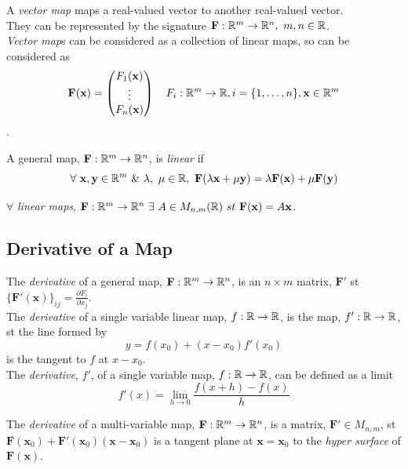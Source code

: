 \documentclass[11pt,a4paper]{article}
\begin{document}
A \textit{vector map} maps a real-valued vector to another real-valued vector.\\
They can be represented by the signature $\textbf{F} : \mathbb{R}^m \to \mathbb{R}^n,\ m,n \in \mathbb{R}$.\\
\textit{Vector map}s can be considered as a collection of linear maps, so can be considered as $$\textbf{F}(\textbf{x}) = \begin{pmatrix} F_1(\textbf{x}) \\ \vdots \\ F_n(\textbf{x})\end{pmatrix} \quad F_i : \mathbb{R}^m \to \mathbb{R}, i=\{1, \dots, n\}, \textbf{x} \in \mathbb{R}^m$$.

A general map, $\textbf{F} : \mathbb{R}^m \to \mathbb{R}^n$, is \textit{linear} if
$$\forall\ \textbf{x}, \textbf{y} \in \real^m\ \&\ \lambda,\ \mu \in \real,\  \textbf{F}(\lambda\textbf{x}+\mu\textbf{y})=\lambda\textbf{F}(\textbf{x})+\mu\textbf{F}(\textbf{y})$$

$\forall$ \textit{linear maps}, $\textbf{F} : \real^m \to \real^n\ \exists\ A \in M_{n,m}(\real)\ st\ \textbf{F}(\textbf{x})=A\textbf{x}$.\\

\subsection{Derivative of a Map}

The \textit{derivative} of a general map, $\textbf{F} : \mathbb{R}^m \to \mathbb{R}^n$, is an $n\times m$ matrix, $\textbf{F}'$ st $\{\textbf{F}'(\textbf{x})\}_{ij}=\frac{\partial F_i}{\partial x_j}$.\\

The \textit{derivative} of a single variable linear map, $f : \mathbb{R} \to \mathbb{R}$, is the map, $f' : \mathbb{R} \to \mathbb{R}$, st the line formed by $$y=f(x_0)+(x-x_0)f'(x_0)$$ is the tangent to $f$ at $x-x_0$.\\

The \textit{derivative}, $f'$, of a single variable map, $f :\mathbb{R}\to\mathbb{R}$, can be defined as a limit
$$f'(x)=\lim_{h\to0}\frac{f(x+h)-f(x)}{h}$$

The \textit{derivative} of a multi-variable map, $\textbf{F} : \mathbb{R}^m \to \mathbb{R}^n$, is a matrix, $\textbf{F}' \in M_{n,m}$, st $\textbf{F}(\textbf{x}_0)+\textbf{F}'(\textbf{x}_0)(\textbf{x} - \textbf{x}_0 )$ is a tangent plane at $\textbf{x}=\textbf{x}_0$ to the \textit{hyper surface} of $\textbf{F}(\textbf{x})$.\\
\end{document}
